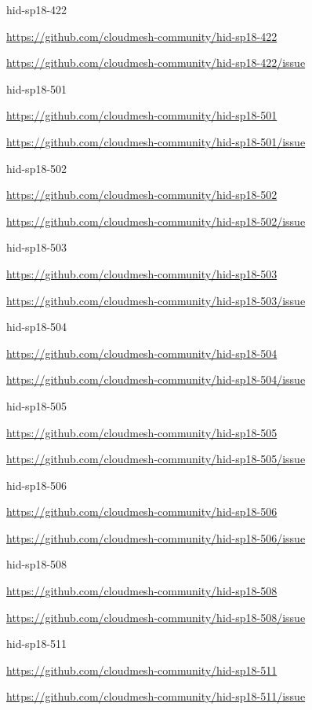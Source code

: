hid-sp18-422

\url{https://github.com/cloudmesh-community/hid-sp18-422}

\url{https://github.com/cloudmesh-community/hid-sp18-422/issue}


hid-sp18-501

\url{https://github.com/cloudmesh-community/hid-sp18-501}

\url{https://github.com/cloudmesh-community/hid-sp18-501/issue}


hid-sp18-502

\url{https://github.com/cloudmesh-community/hid-sp18-502}

\url{https://github.com/cloudmesh-community/hid-sp18-502/issue}


hid-sp18-503

\url{https://github.com/cloudmesh-community/hid-sp18-503}

\url{https://github.com/cloudmesh-community/hid-sp18-503/issue}


hid-sp18-504

\url{https://github.com/cloudmesh-community/hid-sp18-504}

\url{https://github.com/cloudmesh-community/hid-sp18-504/issue}


hid-sp18-505

\url{https://github.com/cloudmesh-community/hid-sp18-505}

\url{https://github.com/cloudmesh-community/hid-sp18-505/issue}


hid-sp18-506

\url{https://github.com/cloudmesh-community/hid-sp18-506}

\url{https://github.com/cloudmesh-community/hid-sp18-506/issue}


hid-sp18-508

\url{https://github.com/cloudmesh-community/hid-sp18-508}

\url{https://github.com/cloudmesh-community/hid-sp18-508/issue}


hid-sp18-511

\url{https://github.com/cloudmesh-community/hid-sp18-511}

\url{https://github.com/cloudmesh-community/hid-sp18-511/issue}


